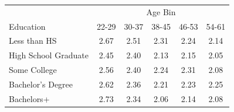 \begin{tabular}{lccccc}
\hline\hline
 & \multicolumn{5}{c}{Age Bin} \\
Education & 22-29 & 30-37 & 38-45 & 46-53 & 54-61 \\
\hline
Less than HS&2.67&2.51&2.31&2.24&2.14\\
High School Graduate&2.45&2.40&2.13&2.15&2.05\\
Some College&2.56&2.40&2.24&2.31&2.08\\
Bachelor's Degree&2.62&2.36&2.21&2.23&2.25\\
Bachelors+&2.73&2.34&2.06&2.14&2.08\\
\hline\hline
\end{tabular}
